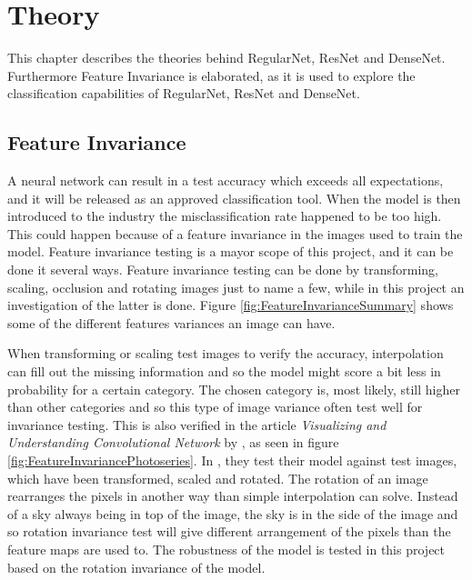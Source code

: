 \chapter{Theory}
\label{chp:theory}

This chapter describes the theories behind RegularNet, ResNet and DenseNet. Furthermore Feature Invariance is elaborated, as it is used to explore the classification capabilities of RegularNet, ResNet and DenseNet.

\section{Feature Invariance}
A neural network can result in a test accuracy which exceeds all expectations, and it will be released as an approved classification tool. When the model is then introduced to the industry the misclassification rate happened to be too high. This could happen because of a feature invariance in the images used to train the model. Feature invariance testing is a mayor scope of this project, and it can be done it several ways. Feature invariance testing can be done by transforming, scaling, occlusion and rotating images just to name a few, while in this project an investigation of the latter is done. Figure \ref{fig:FeatureInvarianceSummary} shows some of the different features variances an image can have.

\FloatBarrier

When transforming or scaling test images to verify the accuracy, interpolation can fill out the missing information and so the model might score a bit less in probability for a certain category. The chosen category is, most likely, still higher than other categories and so this type of image variance often test well for invariance testing. This is also verified in the article \textit{Visualizing and Understanding Convolutional Network} by \citet{Visualizing}, as seen in figure \ref{fig:FeatureInvariancePhotoseries}. In \citet{Visualizing}, they test their model against test images, which have been transformed, scaled and rotated. The rotation of an image rearranges the pixels in another way than simple interpolation can solve. Instead of a sky always being in top of the image, the sky is in the side of the image and so rotation invariance test will give different arrangement of the pixels than the feature maps are used to. The robustness of the model is tested in this project based on the rotation invariance of the model.

\FloatBarrier






